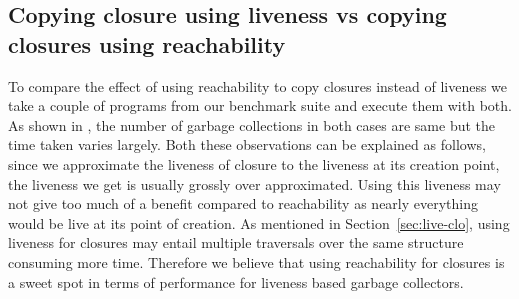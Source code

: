 \documentclass[9pt]{sigplanconf}
\newcommand{\comment}[1]{{\color{Myblue}{(#1)}}}
\newcommand{\cred}[1]{{\color{red}{#1}}}
\begin{document}
\subsection{Copying closure using liveness vs copying closures using reachability}
To compare the  effect of using reachability to  copy closures instead
of liveness we take a couple  of programs from our benchmark suite and
execute them with both. As shown in \cred{figure-add-figure-here}, the
number of  garbage collections  in both  cases are  same but  the time
taken  varies largely.  Both these  observations can  be explained  as
follows, since we approximate the  liveness of closure to the liveness
at its  creation point, the  liveness we  get is usually  grossly over
approximated.  Using this liveness may not  give too much of a benefit
compared to  reachability as  nearly everything would  be live  at its
point of  creation.  As mentioned  in Section~\ref{sec:live-clo}, using  liveness for
closures  may  entail  multiple  traversals over  the  same  structure
consuming more time.  Therefore we believe that using reachability for
closures is  a sweet spot in  terms of performance for  liveness based
garbage collectors.

\end{document}
